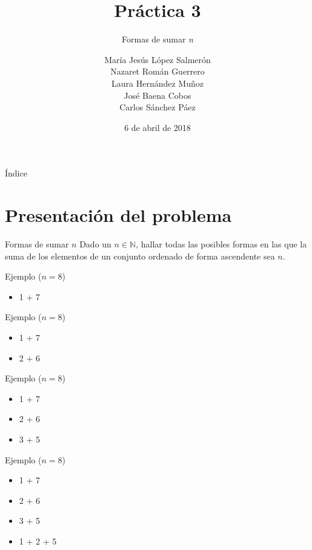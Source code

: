 \documentclass{beamer}
\title{Práctica 3}
\date{6 de abril de 2018}
\subtitle{Formas de sumar \textit{n}}
\author{María Jesús López Salmerón \\ Nazaret Román Guerrero \\ Laura Hernández Muñoz \\ José Baena Cobos  \\ Carlos Sánchez Páez}
\begin{document}
\centering
\begin{frame}
  \titlepage
\end{frame}

\begin{frame}{Índice}
  \tableofcontents
\end{frame}

\section{Presentación del problema}


\begin{frame}[fragile]{Formas de sumar $n$}
Dado un $n \in \mathbb{N}$, hallar todas las posibles formas en las que la suma de los elementos de un conjunto ordenado de forma ascendente sea $n$.
\end{frame}

\begin{frame}[fragile]{Ejemplo ($n=8$)}
\begin{itemize}
	\item 1 + 7
\end{itemize}
\end{frame}

\begin{frame}[fragile]{Ejemplo ($n=8$)}
\begin{itemize}
	\item 1 + 7
	\item 2 + 6
\end{itemize}
\end{frame}

\begin{frame}[fragile]{Ejemplo ($n=8$)}
\begin{itemize}
	\item 1 + 7
	\item 2 + 6
	\item 3 + 5
\end{itemize}
\end{frame}

\begin{frame}[fragile]{Ejemplo ($n=8$)}
\begin{itemize}
	\item 1 + 7
	\item 2 + 6
	\item 3 + 5
	\item 1 + 2 + 5
\end{itemize}
\end{frame}
\end{document}

